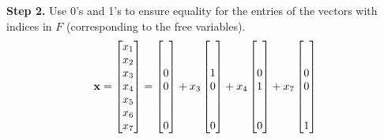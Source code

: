 \documentclass{ximera}
\begin{document}
\begin{example}
  \textbf{Step 2.}  Use 0's and 1's to ensure equality for the entries
  of the vectors with indices in $F$ (corresponding to the free
  variables).
  \[
    \mathbf{x}=
    \begin{bmatrix}x_1\\x_2\\x_3\\x_4\\x_5\\x_6\\x_7\end{bmatrix}=
    \begin{bmatrix}\\ \\ 0\\ 0\\ \\ \\ 0\end{bmatrix}+x_3\begin{bmatrix}\\ \\ 1\\ 0\\ \\ \\ 0\end{bmatrix}+x_4\begin{bmatrix}\\ \\ 0\\ 1\\ \\ \\ 0\end{bmatrix}+x_7\begin{bmatrix}\\ \\ 0\\ 0\\ \\ \\ 1\end{bmatrix}
  \]
  

\end{example}
\end{document}
